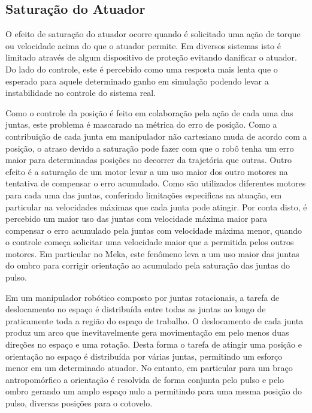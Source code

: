 \subsection{Saturação do Atuador}

O efeito de saturação do atuador ocorre quando é solicitado uma ação de torque ou velocidade acima do que o atuador permite. Em diversos sistemas isto é limitado através de algum dispositivo de proteção evitando danificar o atuador. Do lado do controle, este é percebido como uma resposta mais lenta que o esperado para aquele determinado ganho em simulação podendo levar a instabilidade no controle do sistema real.

Como o controle da posição é feito em colaboração pela ação de cada uma das juntas, este problema é mascarado na métrica do erro de posição. Como a contribuição de cada junta em manipulador não cartesiano muda de acordo com a posição, o atraso devido a saturação pode fazer com que o robô tenha um erro maior para determinadas posições no decorrer da trajetória que outras. Outro efeito é a saturação de um motor levar a um uso maior dos outro motores na tentativa de compensar o erro acumulado. Como são utilizados diferentes motores para cada uma das juntas, conferindo limitações especificas na atuação, em particular na velocidades máximas que cada junta pode atingir. Por conta disto, é percebido um maior uso das juntas com velocidade máxima maior para compensar o erro acumulado pela juntas com velocidade máxima menor, quando o controle começa solicitar uma velocidade maior que a permitida pelos outros motores. Em particular no Meka, este fenômeno leva a um uso maior das juntas do ombro para corrigir orientação ao acumulado pela saturação das juntas do pulso.

Em um manipulador robótico composto por juntas rotacionais, a tarefa de deslocamento no espaço é distribuída entre todas as juntas ao longo de praticamente toda a região do espaço de trabalho. O deslocamento de cada junta produz um arco que inevitavelmente gera movimentação em pelo menos duas direções no espaço e uma rotação. Desta forma o tarefa de atingir uma posição e orientação no espaço é distribuída por várias juntas, permitindo um esforço menor em um determinado atuador. No entanto, em particular para um braço antropomórfico a orientação é resolvida de forma conjunta pelo pulso e pelo ombro gerando um amplo espaço nulo a permitindo para uma mesma posição do pulso, diversas posições para o cotovelo.


